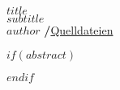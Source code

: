 \makeatletter
\begin{center}
  \vspace*{0.5cm}
  \textbf{\textsf{\Huge $title$}}\\
  \vspace{0.1cm}
  \textsf{\textit{\large $subtitle$}}\\
  \vspace{0.5cm}
  \textsf{\large $author$ \hspace{0.3cm}\textbf{/}\hspace{0.3cm}\mbox{\large \faGithub\space \href{$source.github$}{Quelldateien}}}
\end{center}
\makeatother
\normalfont

$if(abstract)$
\begin{abstract}
$abstract$
\end{abstract}
$endif$
